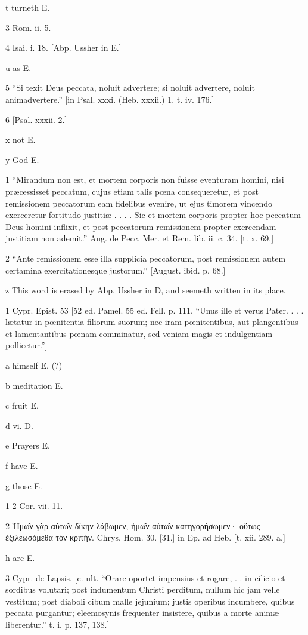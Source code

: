 t
turneth E.

3
Rom. ii. 5.

4
Isai. i. 18. [Abp. Ussher in E.]

u
as E.

5
“Si texit Deus peccata, noluit advertere; si noluit advertere, noluit animadvertere.” [in Psal. xxxi. (Heb. xxxii.) 1. t. iv. 176.]

6
[Psal. xxxii. 2.]

x
not E.

y
God E.

1
“Mirandum non est, et mortem corporis non fuisse eventuram homini, nisi præcessisset peccatum, cujus etiam talis pœna consequeretur, et post remissionem peccatorum eam fidelibus evenire, ut ejus timorem vincendo exerceretur fortitudo justitiæ . . . . Sic et mortem corporis propter hoc peccatum Deus homini inflixit, et post peccatorum remissionem propter exercendam justitiam non ademit.” Aug. de Pecc. Mer. et Rem. lib. ii. c. 34. [t. x. 69.]

2
“Ante remissionem esse illa supplicia peccatorum, post remissionem autem certamina exercitationesque justorum.” [August. ibid. p. 68.]

z
This word is erased by Abp. Ussher in D, and seemeth written in its place.

1
Cypr. Epist. 53 [52 ed. Pamel. 55 ed. Fell. p. 111. “Unus ille et verus Pater. . . . lætatur in pœnitentia filiorum suorum; nec iram pœnitentibus, aut plangentibus et lamentantibus pœnam comminatur, sed veniam magis et indulgentiam pollicetur.”]

a
himself E. (?)

b
meditation E.

c
fruit E.

d
vi. D.

e
Prayers E.

f
have E.

g
those E.

1
2 Cor. vii. 11.

2
Ἡμω̑ν γὰρ αὐτω̑ν δίκην λάβωμεν, ἡμω̑ν αὐτω̑ν κατηγορήσωμεν· οὕτως ἐξιλεωσόμεθα τὸν κριτήν. Chrys. Hom. 30. [31.] in Ep. ad Heb. [t. xii. 289. a.]

h
are E.

3
Cypr. de Lapsis. [c. ult. “Orare oportet impensius et rogare, . . in cilicio et sordibus volutari; post indumentum Christi perditum, nullum hic jam velle vestitum; post diaboli cibum malle jejunium; justis operibus incumbere, quibus peccata purgantur; eleemosynis frequenter insistere, quibus a morte animæ liberentur.” t. i. p. 137, 138.]

